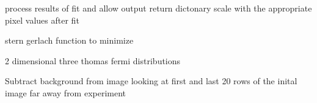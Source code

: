 \documentclass[letterpaper,10pt,english]{sphinxmanual}
\begin{document}
\begin{fulllineitems}
\begin{fulllineitems}
\begin{quote}
\begin{description}
\begin{itemize}
\end{itemize}

\end{description}\end{quote}

\end{fulllineitems}


\begin{fulllineitems}
\label{fit_object:Fitobject.fit_object.process_results}
process results of fit and allow output return dictonary
scale with the appropriate pixel values after fit

\end{fulllineitems}


\begin{fulllineitems}
\label{fit_object:Fitobject.fit_object.run}
\end{fulllineitems}


\begin{fulllineitems}
\label{fit_object:Fitobject.fit_object.sg2min}
stern gerlach function to minimize

\end{fulllineitems}


\begin{fulllineitems}
\label{fit_object:Fitobject.fit_object.stern_gerlach_2D}
2 dimensional three thomas fermi distributions

\end{fulllineitems}


\begin{fulllineitems}
\label{fit_object:Fitobject.fit_object.subtract_background}
Subtract background from image looking at first and last 20
rows of the inital image far away from experiment

\end{fulllineitems}


\end{fulllineitems}
\end{document}
